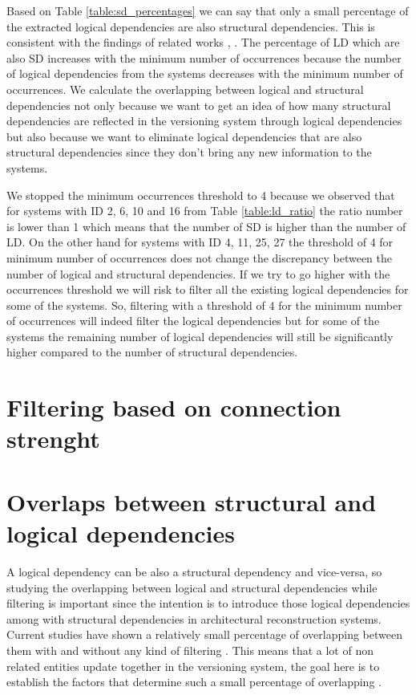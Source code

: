 \documentclass[12pt]{mitthesis}
\begin{document}
Based on Table \ref{table:sd_percentages} we can say that only a small percentage of the extracted logical dependencies are also structural dependencies. This is consistent with the findings of related works \cite{DBLP:journals/jss/AjienkaC17}, \cite{DBLP:journals/ese/AjienkaCC18}. The percentage of LD which are also SD  increases with the minimum number of occurrences because the number of logical dependencies from the systems decreases with the minimum number of occurrences. 
We calculate the overlapping between logical and structural dependencies not only because we want to get an idea of how many structural dependencies are reflected in the versioning system through logical dependencies but also because we want to eliminate logical dependencies that are also structural dependencies since they don't bring any new information to the systems.

We stopped the minimum occurrences threshold to 4 because we observed that for systems with ID 2, 6, 10 and 16 from Table \ref{table:ld_ratio} the ratio number is lower than 1 which means that the number of SD is higher than the number of LD. On the other hand for systems with ID 4, 11, 25, 27 the threshold of 4 for minimum number of occurrences does not change the discrepancy between the number of logical and structural dependencies.
If we try to go higher with the occurrences threshold we will risk to filter all the existing logical dependencies for some of the systems.
So, filtering with a threshold of 4 for the minimum number of occurrences will indeed filter the logical dependencies but for some of the systems the remaining number of logical dependencies will still be significantly higher compared to the number of structural dependencies.




\section{Filtering based on connection strenght}
\label{sec:filterstrength}





\section{Overlaps between structural and logical dependencies}
\label{sec:overlaps}
A logical dependency can be also a structural dependency and vice-versa, so studying the overlapping between logical and structural dependencies while filtering is important since the intention is to introduce those logical dependencies among with structural dependencies in architectural reconstruction systems. Current studies have shown a relatively small percentage of overlapping between them with and without any kind of filtering \cite{DBLP:journals/jss/AjienkaC17}. This means that a lot of non related entities update together in the versioning system, the goal here is to establish the factors that determine such a small percentage of overlapping \cite{enase19}.
\end{document}
